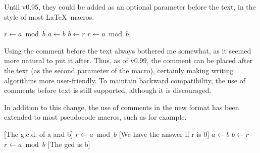 \documentclass[a4paper, 11pt]{article}
\begin{document}
Until  v0.95, they could be added as an optional parameter before the text, in the style of most \LaTeX\ macros.

\begingroup
{}
\begin{tcblisting}{}
    \begin{algorithmic}[1]
            \State $r\gets a\bmod b$
                \State $a\gets b$
                \State $b\gets r$
                \State $r\gets a\bmod b$
            \EndWhile
        \EndProcedure
    \end{algorithmic}
\end{tcblisting}
\endgroup

Using the comment before the text always bothered me somewhat, as it seemed more natural to put it after.
%
Thus, as of v0.99, the comment can be placed after the text (as the second parameter of the macro), certainly making writing algorithms more user-friendly. To maintain backward compatibility, the use of comments before text is still supported, although it is discouraged.

%
In addition to this change, the use of comments in the new format has been extended to most pseudocode macros, such as  for example.

\begingroup
{}
\begin{tcblisting}{}
    \begin{algorithmic}[1]
        [The g.c.d. of a and b]  %
            \State $r\gets a\bmod b$
            [We have the answer if r is 0]  %
                \State $a\gets b$
                \State $b\gets r$
                \State $r\gets a\bmod b$
            [The gcd is b]  %
        \EndProcedure
    \end{algorithmic}
\end{tcblisting}
\endgroup
\end{document}
